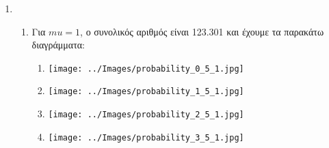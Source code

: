 \documentclass[12pt]{article}
\begin{document}
\begin{enumerate}
\item{}
        \begin{enumerate}
            \item{}
                Για $mu = 1$, ο συνολικός αριθμός είναι 123.301 και έχουμε τα παρακάτω διαγράμματα:
                \begin{enumerate}
                    \item{}
                        \begin{center}
                            \texttt{[image: ../Images/probability\_0\_5\_1.jpg]}
                        \end{center}
                    \item{}
                        \begin{center}
                            \texttt{[image: ../Images/probability\_1\_5\_1.jpg]}
                        \end{center}
                    \item{}
                        \begin{center}
                            \texttt{[image: ../Images/probability\_2\_5\_1.jpg]}
                        \end{center}
                    \item{}
                        \begin{center}
                            \texttt{[image: ../Images/probability\_3\_5\_1.jpg]}
                        \end{center}
                \end{enumerate}


\end{enumerate}
\end{enumerate}
\end{document}

